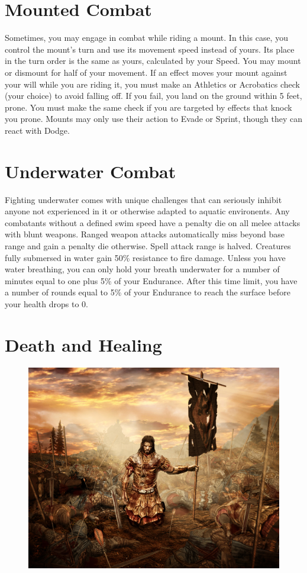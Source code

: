 \documentclass[12pt]{book}
\begin{document}
\section{Mounted Combat}

Sometimes, you may engage in combat while riding a mount. In this case, you control the mount's turn and use its movement speed instead of yours. Its place in the turn order is the same as yours, calculated by your Speed. You may mount or dismount for half of your movement. If an effect moves your mount against your will while you are riding it, you must make an Athletics or Acrobatics check (your choice) to avoid falling off. If you fail, you land on the ground within 5 feet, prone. You must make the same check if you are targeted by effects that knock you prone. Mounts may only use their action to Evade or Sprint, though they can react with Dodge.

\section{Underwater Combat}

Fighting underwater comes with unique challenges that can seriously inhibit anyone not experienced in it or otherwise adapted to aquatic environents. Any combatants without a defined swim speed have a penalty die on all melee attacks with blunt weapons. Ranged weapon attacks automatically miss beyond base range and gain a penalty die otherwise. Spell attack range is halved. Creatures fully submersed in water gain 50\% resistance to fire damage. Unless you have water breathing, you can only hold your breath underwater for a number of minutes equal to one plus 5\% of your Endurance. After this time limit, you have a number of rounds equal to 5\% of your Endurance to reach the surface before your health drops to 0.

\section{Death and Healing}

\begin{figure}
	\includegraphics[width=\textwidth]{victory.png}
\end{figure}
\end{document}

